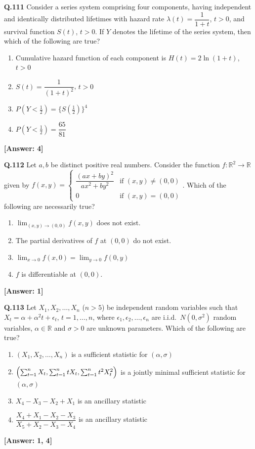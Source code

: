 \documentclass[12pt,a4paper]{article}
\newcommand{\ans}[1]{\quad\textcolor{anscolor}{\textbf{[Answer: #1]}}}
\begin{document}
\textbf{Q.111} Consider a series system comprising four components, having independent and identically distributed lifetimes with hazard rate $\lambda(t)=\dfrac{1}{1+t}$, $t>0$, and survival function $S(t)$, $t>0$. If $Y$ denotes the lifetime of the series system, then which of the following are true?
\begin{enumerate}[label=\arabic*.]
\item Cumulative hazard function of each component is $H(t)=2\ln(1+t)$, $t>0$
\item $S(t)=\dfrac{1}{(1+t)^2}$, $t>0$
\item $P(Y<\tfrac{1}{2})=\{S(\tfrac{1}{2})\}^4$
\item $P(Y<\tfrac{1}{2})=\dfrac{65}{81}$
\end{enumerate}\ans{4}

\textbf{Q.112} Let $a,b$ be distinct positive real numbers. Consider the function $f:\mathbb{R}^2\to\mathbb{R}$ given by $f(x,y)=\begin{cases}\dfrac{(ax+by)^2}{ax^2+by^2}&\text{if }(x,y)\neq(0,0)\\0&\text{if }(x,y)=(0,0)\end{cases}$. Which of the following are necessarily true?
\begin{enumerate}[label=\arabic*.]
\item $\lim_{(x,y)\to(0,0)}f(x,y)$ does not exist.
\item The partial derivatives of $f$ at $(0,0)$ do not exist.
\item $\lim_{x\to0}f(x,0)=\lim_{y\to0}f(0,y)$
\item $f$ is differentiable at $(0,0)$.
\end{enumerate}\ans{1}

\textbf{Q.113} Let $X_1,X_2,\ldots,X_n$ ($n>5$) be independent random variables such that $X_t=\alpha+\alpha^2t+\epsilon_t$, $t=1,\ldots,n$, where $\epsilon_1,\epsilon_2,\ldots,\epsilon_n$ are i.i.d.\ $N(0,\sigma^2)$ random variables, $\alpha\in\mathbb{R}$ and $\sigma>0$ are unknown parameters. Which of the following are true?
\begin{enumerate}[label=\arabic*.]
\item $(X_1,X_2,\ldots,X_n)$ is a sufficient statistic for $(\alpha,\sigma)$
\item $\Bigl(\sum_{t=1}^nX_t,\sum_{t=1}^ntX_t,\sum_{t=1}^nt^2X_t^2\Bigr)$ is a jointly minimal sufficient statistic for $(\alpha,\sigma)$
\item $X_4-X_3-X_2+X_1$ is an ancillary statistic
\item $\dfrac{X_4+X_1-X_2-X_3}{X_5+X_2-X_3-X_4}$ is an ancillary statistic
\end{enumerate}\ans{1, 4}
\end{document}
